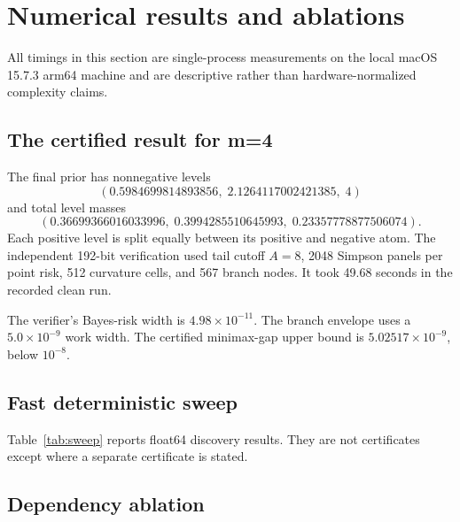 \section{Numerical results and ablations}
\label{sec:results}

All timings in this section are single-process measurements on the local
macOS 15.7.3 arm64 machine and are descriptive rather than hardware-normalized
complexity claims.

\subsection{The certified result for m=4}

The final prior has nonnegative levels
\[
 (0.5984699814893856,\;2.1264117002421385,\;4)
\]
and total level masses
\[
 (0.36699366016033996,\;0.3994285510645993,\;
   0.23357778877506074).
\]
Each positive level is split equally between its positive and negative atom.
The independent 192-bit verification used tail cutoff $A=8$, 2048 Simpson
panels per point risk, 512 curvature cells, and 567 branch nodes.  It took
49.68 seconds in the recorded clean run.

\begin{table}[ht]
\centering
\caption{Outward-rounded $m=4$ certificate.  Displayed endpoints are rounded
outward from the longer Arb output.}
\label{tab:m4}
\small

\end{table}

The verifier's Bayes-risk width is $4.98\times10^{-11}$.  The branch envelope
uses a $5.0\times10^{-9}$ work width.  The certified minimax-gap upper bound is
$5.02517\times10^{-9}$, below $10^{-8}$.

\subsection{Fast deterministic sweep}

Table~\ref{tab:sweep} reports float64 discovery results.  They are not
certificates except where a separate certificate is stated.

\begin{table}[ht]
\centering
\caption{Adaptive-support float64 sweep; no ex ante parameter grid.}
\label{tab:sweep}
\small

\end{table}

\subsection{Dependency ablation}

